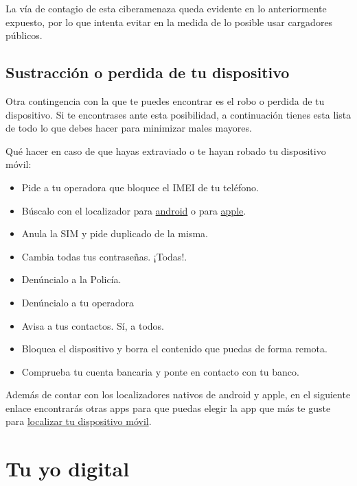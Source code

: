 \documentclass[
  spanish,
  a4paper,
  openany]{book}
\begin{document}
La vía de contagio de esta ciberamenaza queda evidente en lo anteriormente expuesto, por lo que intenta evitar en la medida de lo posible usar cargadores públicos.

\hypertarget{sustracciuxf3n-o-perdida-de-tu-dispositivo}{%
\section{Sustracción o perdida de tu dispositivo}\label{sustracciuxf3n-o-perdida-de-tu-dispositivo}}

Otra contingencia con la que te puedes encontrar es el robo o perdida de tu dispositivo. Si te encontrases ante esta posibilidad, a continuación tienes esta lista de todo lo que debes hacer para minimizar males mayores.

Qué hacer en caso de que hayas extraviado o te hayan robado tu dispositivo móvil:

\begin{itemize}
\item
  Pide a tu operadora que bloquee el IMEI de tu teléfono.
\item
  Búscalo con el localizador para \href{https://myaccount.google.com/intro/find-your-phone?hl=es-ES}{android} o para \href{https://www.apple.com/es/icloud/find-my/}{apple}.
\item
  Anula la SIM y pide duplicado de la misma.
\item
  Cambia todas tus contraseñas. ¡Todas!.
\item
  Denúncialo a la Policía.
\item
  Denúncialo a tu operadora
\item
  Avisa a tus contactos. Sí, a todos.
\item
  Bloquea el dispositivo y borra el contenido que puedas de forma remota.
\item
  Comprueba tu cuenta bancaria y ponte en contacto con tu banco.
\end{itemize}

Además de contar con los localizadores nativos de android y apple, en el siguiente enlace encontrarás otras apps para que puedas elegir la app que más te guste para \href{https://www.osi.es/es/herramientas-gratuitas?herramienta_selec\%5B0\%5D=122}{localizar tu dispositivo móvil}.

\hypertarget{tu-yo-digital}{%
\chapter{Tu yo digital}\label{tu-yo-digital}}
\end{document}
